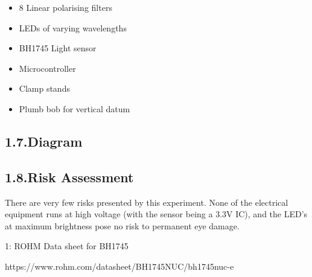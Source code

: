 \documentclass{article}
\begin{document}
\begin{itemize}[noitemsep,topsep=\mdcompacttopsep]%

\item{}8 Linear polarising filters%

\item{}LEDs of varying wavelengths%

\item{}BH1745 Light sensor%

\item{}Microcontroller%

\item{}Clamp stands%

\item{}Plumb bob for vertical datum%
\end{itemize}%

\subsection{1.7.\hspace*{0.5em}Diagram}\label{sec-diagram}%

\subsection{1.8.\hspace*{0.5em}Risk Assessment}\label{sec-risk-assessment}%

\noindent{}There are very few risks presented by this experiment. None of the electrical equipment runs at high voltage (with the sensor being a 3.3V IC), and the LED's at maximum brightness pose no risk to permanent eye damage.%

{%
\begin{thebibliography}{0}%
\label{sec-bibliography}%

\mdbibitemlabel{}1: ROHM Data sheet for BH1745

https://www.rohm.com/datasheet/BH1745NUC/bh1745nuc-e%
\label{sensor}%
\par%
\end{thebibliography}}%
\end{document}
